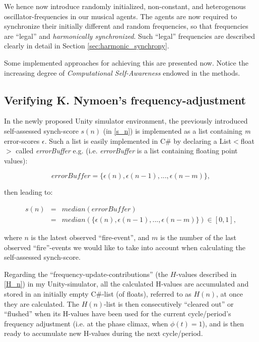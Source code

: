 	We hence now introduce randomly initialized, non-constant, and heterogenous oscillator-frequencies in our musical agents. The agents are now required to synchronize their initially different and random frequencies, so that frequencies are ``legal'' and \textit{harmonically synchronized}. Such ``legal'' frequencies are described clearly in detail in Section \ref{sec:harmonic_synchrony}.
	
	Some implemented approaches for achieving this are presented now. Notice the increasing degree of \textit{Computational Self-Awareness} endowed in the methods.
	
	
	\subsection{Verifying K. Nymoen's frequency-adjustment}
	
	In the newly proposed Unity simulator environment, the previously introduced self-assessed synch-score $s(n)$ (in \ref{s_n}) is implemented as a list containing \textit{m} error-scores $\epsilon$. Such a list is easily implemented in C\# by declaring a List$<$float$>$ called \textit{errorBuffer} e.g. (i.e. \textit{errorBuffer} is a list containing floating point values):
	
	\begin{equation}
	\label{error_buffer}
		errorBuffer = \{\epsilon(n), \epsilon(n-1), ... , \epsilon(n-m)\},
	\end{equation} \nl
	
	then leading to:
	
	\begin{equation}
	\label{self_assessed_synch}
		\begin{array}{rrclcl}
		s(n) & = & median(errorBuffer) \\ 
		& = & median(\{\epsilon(n), \epsilon(n-1), ... , \epsilon(n-m)\}) \in [0, 1],
		\end{array}
	\end{equation} \nl
	
	where $n$ is the latest observed ``fire-event'', and $m$ is the number of the last observed ``fire''-events we would like to take into account when calculating the self-assessed synch-score. \nl
	
	Regarding the ``frequency-update-contributions'' (the $H$-values described in \ref{H_n}) in my Unity-simulator, all the calculated H-values are accumulated and stored in an initially empty C\#-list (of floats), referred to as $H(n)$, at once they are calculated. The $H(n)$-list is then consecutively ``cleared out'' or ``flushed'' when its H-values have been used for the current cycle/period's frequency adjustment (i.e. at the phase climax, when $\phi(t)=1$), and is then ready to accumulate new H-values during the next cycle/period.
	
